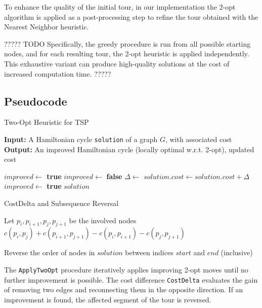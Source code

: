 To enhance the quality of the initial tour, in our implementation the 2-opt algorithm is applied as a post-processing step to refine the tour obtained 
with the Nearest Neighbor heuristic. 

????? TODO
Specifically, the greedy procedure is run from all possible starting nodes, and for each resulting tour, 
the 2-opt heuristic is applied independently. This exhaustive variant can produce high-quality solutions at the cost of increased computation time. 
?????

\subsection{Pseudocode}

\begin{algorithm}[H]
\caption{Two-Opt Heuristic for TSP}
\label{alg:twoopt}
\textbf{Input:} A Hamiltonian cycle \texttt{solution} of a graph $G$, with associated cost\\
\textbf{Output:} An improved Hamiltonian cycle (locally optimal w.r.t. 2-opt), updated cost
\begin{algorithmic}[1]
    \State $improved \gets$ \textbf{true}
        \State $improved \gets$ \textbf{false}
                \State $\Delta \gets$ 
                    \State {}
                    \State $solution.cost \gets solution.cost + \Delta$
                    \State $improved \gets$ \textbf{true}
                \EndIf
            \EndFor
        \EndFor
    \EndWhile
    \State \Return $solution$
\EndProcedure
\end{algorithmic}
\end{algorithm}

\begin{algorithm}[H]
\caption{CostDelta and Subsequence Reversal}
\label{alg:subroutines}
\begin{algorithmic}[1]
    \State Let $p_i, p_{i+1}, p_j, p_{j+1}$ be the involved nodes
    \State \Return $c(p_i, p_j) + c(p_{i+1}, p_{j+1}) - c(p_i, p_{i+1}) - c(p_j, p_{j+1})$
\EndFunction

    \State Reverse the order of nodes in $solution$ between indices $start$ and $end$ (inclusive)
\EndProcedure
\end{algorithmic}
\end{algorithm}

The \texttt{ApplyTwoOpt} procedure iteratively applies improving 2-opt moves until no further improvement is possible. 
The cost difference \texttt{CostDelta} evaluates the gain of removing two edges and reconnecting them in the opposite direction. 
If an improvement is found, the affected segment of the tour is reversed.
